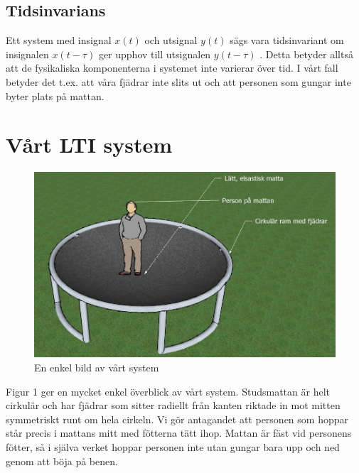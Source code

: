 \documentclass[10pt,a4paper]{article}
\begin{document}

\subsection{Tidsinvarians}


Ett system med insignal $x(t)$ och utsignal $y(t)$ sägs vara tidsinvariant om insignalen $x(t - \tau)$ ger upphov till utsignalen $y(t - \tau)$ \cite{sune2000}. Detta betyder alltså att de fysikaliska komponenterna i systemet inte varierar över tid. I vårt fall betyder det t.ex. att våra fjädrar inte slits ut och att personen som gungar inte byter plats på mattan. 

\newpage
\section{Vårt LTI system}

\begin{figure}[ht]
\begin{center}
\includegraphics[scale=0.62]{Bild2}
\caption{En enkel bild av vårt system}
\end{center}
\end{figure}

Figur 1 ger en mycket enkel överblick av vårt system. Studsmattan är helt cirkulär och har fjädrar som sitter radiellt från kanten riktade in mot mitten symmetriskt runt om hela cirkeln. Vi gör antagandet att personen som hoppar står precis i mattans mitt med fötterna tätt ihop. Mattan är fäst vid personens fötter, så i själva verket hoppar personen inte utan gungar bara upp och ned genom att böja på benen.
\end{document}
